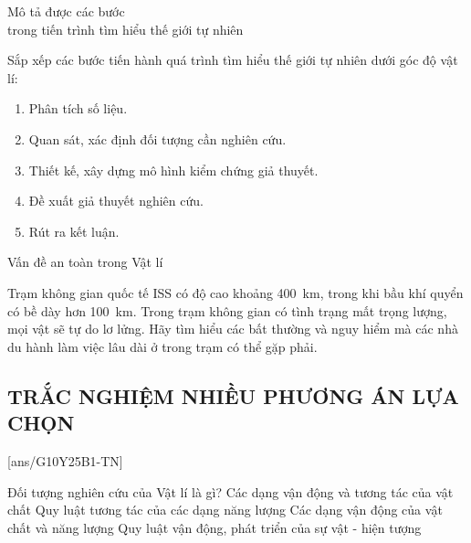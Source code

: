 \begin{dang}{Mô tả được các bước \\trong tiến trình tìm hiểu thế giới tự nhiên}
\end{dang}
\begin{vd}
	Sắp xếp các bước tiến hành quá trình tìm hiểu thế giới tự nhiên dưới góc độ vật lí:
	\begin{enumerate}[label= (\arabic*)]
		\item Phân tích số liệu.
		\item Quan sát, xác định đối tượng cần nghiên cứu.
		\item Thiết kế, xây dựng mô hình kiểm chứng giả thuyết.
		\item Đề xuất giả thuyết nghiên cứu.
		\item Rút ra kết luận.
	\end{enumerate}
\end{vd}
\begin{dang}{Vấn đề an toàn trong Vật lí}
\end{dang}
\begin{vd}
	Trạm không gian quốc tế ISS có độ cao khoảng \SI{400}{km}, trong khi bầu khí quyển có bề dày hơn \SI{100}{km}. Trong trạm không gian có tình trạng mất trọng lượng, mọi vật sẽ tự do lơ lửng. Hãy tìm hiểu các bất thường và nguy hiểm mà các nhà du hành làm việc lâu dài ở trong trạm có thể gặp phải.
	
\end{vd}

\subsection{TRẮC NGHIỆM NHIỀU PHƯƠNG ÁN LỰA CHỌN}
\setcounter{ex}{0}
[ans/G10Y25B1-TN]
\begin{ex}
	Đối tượng nghiên cứu của Vật lí là gì?
	\choice
	{Các dạng vận động và tương tác của vật chất}
	{Quy luật tương tác của các dạng năng lượng}
	{\True Các dạng vận động của vật chất và năng lượng}
	{Quy luật vận động, phát triển của sự vật - hiện tượng}
	\loigiai{}
\end{ex}


